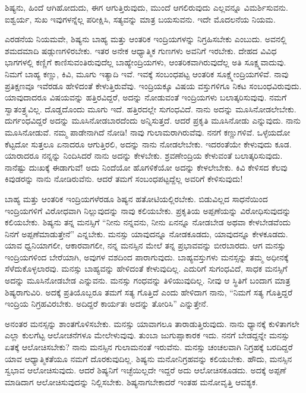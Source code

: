 ಶಿಷ್ಯನು, ಹಿಂದೆ ಆಗಿಹೋದುದು, ಈಗ ಆಗುತ್ತಿರುವುದು, ಮುಂದೆ ಆಗಲಿರುವುದು ಎಲ್ಲವನ್ನೂ ವಿಮರ್ಶಿಸುವನು. ಐಶ್ವರ್ಯ, ಸುಖ ಇವುಗಳನ್ನೆಲ್ಲ ಪರೀಕ್ಷಿಸಿ, ಸತ್ಯವನ್ನು ಮಾತ್ರ ಬಯಸುವನು. ಇದೇ ಮೊದಲನೆಯ ನಿಯಮ.

ಎರಡನೆಯ ನಿಯಮವೇ, ಶಿಷ್ಯನು ಬಾಹ್ಯ ಮತ್ತು ಆಂತರಿಕ ಇಂದ್ರಿಯಗಳನ್ನು ನಿಗ್ರಹಿಸಬೇಕು ಎಂಬುದು. ಅವನಲ್ಲಿ ಶಮದಮಾದಿ ಷಡ್ಗುಣಗಳಿರಬೇಕು. ಇತರ ಅನೇಕ ಆಧ್ಯಾತ್ಮಿಕ ಗುಣಗಳು ಅವನಿಗೆ ಇರಬೇಕು. ದೇಹದ ವಿವಿಧ ಭಾಗಗಳಲ್ಲಿ ಕಣ್ಣಿಗೆ ಕಾಣಿಸುವಂತಿರುವುದೆಲ್ಲ ಬಾಹ್ಯೇಂದ್ರಿಯಗಳು, ಆಂತರಿಕವಾಗಿರುವುದೆಲ್ಲ ಅತಿ ಸೂಕ್ಷ್ಮವಾದುವು. ನಿಮಗೆ ಬಾಹ್ಯ ಕಣ್ಣು, ಕಿವಿ, ಮೂಗು ಇತ್ಯಾದಿ ಇವೆ. ಇವಕ್ಕೆ ಸಂಬಂಧಪಟ್ಟ ಆಂತರಿಕ ಸೂಕ್ಷ್ಮೇಂದ್ರಿಯಗಳಿವೆ. ನಾವು ಪ್ರತಿಕ್ಷಣವೂ ಇವೆರಡೂ ಹೇಳಿದಂತೆ ಕೇಳುತ್ತಿರುವೆವು. ಇಂದ್ರಿಯಕ್ಕೂ ವಿಷಯ ವಸ್ತುಗಳಿಗೂ ನಿಕಟ ಸಂಬಂಧವಿರುವುದು. ಯಾವುದಾದರೂ ವಿಷಯವನ್ನು ಹತ್ತಿರವಿದ್ದರೆ, ಅದನ್ನು ನೋಡುವಂತೆ ಇಂದ್ರಿಯಗಳು ಬಲಾತ್ಕರಿಸುವುವು. ನಮಗೆ ಸ್ವಾತಂತ್ರ್ಯವಿಲ್ಲ. ದೊಡ್ಡದೊಂದು ಮೂಗು ಇದೆ. ಹತ್ತಿರದಲ್ಲೇ ಸುಗಂಧವಿದೆ. ನಾನು ಅದನ್ನು ಮೂಸಿನೋಡಲೇಬೇಕು. ದುರ್ಗಂಧವಿದ್ದರೆ ಅದನ್ನು ಮೂಸಿನೋಡಬಾರದೆಂದು ಅನ್ನಿಸುತ್ತದೆ. ಆದರೆ ಪ್ರಕೃತಿ ಮೂಸಿನೋಡು ಎನ್ನುವುದು. ನಾನು ಮೂಸಿನೋಡುವೆ. ನಮ್ಮ ಪಾಡೇನಾಗಿದೆ ನೋಡಿ! ನಾವು ಗುಲಾಮರಾಗಿರುವೆವು. ನನಗೆ ಕಣ್ಣುಗಳಿವೆ. ಒಳ್ಳೆಯದೋ ಕೆಟ್ಟದೋ ಸುತ್ತಲೂ ಏನಾದರೂ ಆಗುತ್ತಿರಲಿ, ಅದನ್ನು ನಾನು ನೋಡಲೇಬೇಕು. ಇದರಂತೆಯೇ ಕೇಳುವುದು ಕೂಡ. ಯಾರಾದರೂ ನನ್ನನ್ನು ನಿಂದಿಸಿದರೆ ನಾನು ಅದನ್ನು ಕೇಳಬೇಕು. ಶ್ರವಣೇಂದ್ರಿಯ ಕೇಳುವಂತೆ ಬಲಾತ್ಕರಿಸುವುದು. ನಾನೆಷ್ಟು ದುಃಖಕ್ಕೆ ಈಡಾಗುವೆ! ಅದು ನಿಂದೆಯೋ ಹೊಗಳಿಕೆಯೋ ಅದನ್ನು ಕೇಳಲೇಬೇಕು. ಕಿವಿ ಕೇಳಿಸದ ಕೆಲವು ಕಿವುಡರನ್ನು ನಾನು ನೋಡಿರುವೆನು. ಆದರೆ ತಮಗೆ ಸಂಬಂಧಪಟ್ಟದ್ದೆಲ್ಲ ಅವರಿಗೆ ಕೇಳಿಸುವುದು!

ಬಾಹ್ಯ ಮತ್ತು ಆಂತರಿಕ ಇಂದ್ರಿಯಗಳೆರಡೂ ಶಿಷ್ಯನ ಹತೋಟಿಯಲ್ಲಿರಬೇಕು. ಬಿಡುವಿಲ್ಲದ ಸಾಧನೆಯಿಂದ ಇಂದ್ರಿಯಗಳಿಗೆ ವಿರೋಧವಾಗಿ ನಿಲ್ಲುವುದನ್ನು ನಾವು ಕಲಿಯಬೇಕು. ಪ್ರಕೃತಿಯ ಅಪ್ಪಣೆಯನ್ನು ವಿರೋಧಿಸುವುದನ್ನು ಕಲಿಯಬೇಕು. ಶಿಷ್ಯನು ತನ್ನ ಮನಸ್ಸಿಗೆ “ನೀನು ನನ್ನವನು, ನೀನು ಏನನ್ನೂ ನೋಡಬೇಡ ಅಥವಾ ಕೇಳಬೇಡವೆಂದು ನಿನಗೆ ಅಪ್ಪಣೆಮಾಡುತ್ತೇನೆ'' ಎನ್ನಬೇಕು. ಮನಸ್ಸು ಯಾವುದನ್ನೂ ನೋಡಕೂಡದು, ಯಾವುದನ್ನೂ ಕೇಳಕೂಡದು. ಯಾವ ಧ್ವನಿಯಾಗಲೀ, ಆಕಾರವಾಗಲೀ, ನನ್ನ ಮನಸ್ಸಿನ ಮೇಲೆ ತನ್ನ ಪ್ರಭಾವವನ್ನು ಬೀರಬಾರದು. ಆಗ ಮನಸ್ಸು ಇಂದ್ರಿಯಗಳಿಂದ ಬೇರೆಯಾಗಿ, ಅವುಗಳ ವಶದಿಂದ ಪಾರಾಗುವುದು. ಬಾಹ್ಯವಸ್ತುಗಳು ಮನಸ್ಸನ್ನು ತಮ್ಮ ಅಧೀನಕ್ಕೆ ಸೆಳೆದುಕೊಳ್ಳಲಾರವು. ಮನಸ್ಸು ಬಾಹ್ಯವನ್ನು ಹೇಳಿದಂತೆ ಕೇಳುವುದಿಲ್ಲ. ಎದುರಿಗೆ ಸುಗಂಧವಿದೆ, ಸಾಧಕ ಮನಸ್ಸಿಗೆ ಅದನ್ನು ಮೂಸಿನೋಡಬೇಡ ಎನ್ನುವನು. ಮನಸ್ಸು ಗಂಧವನ್ನು ತಿಳಿಯುವುದಿಲ್ಲ. ನೀವು ಆ ಸ್ಥಿತಿಗೆ ಬಂದಾಗ ಮಾತ್ರ ಶಿಷ್ಯರಾಗುವಿರಿ. ಅದಕ್ಕೆ ಪ್ರತಿಯೊಬ್ಬರೂ ತಮಗೆ ಸತ್ಯ ಗೊತ್ತಿದೆ ಎಂದು ಹೇಳಿದಾಗ ನಾನು, “ನಿಮಗೆ ಸತ್ಯ ಗೊತ್ತಿದ್ದರೆ ಇಂದ್ರಿಯ ನಿಗ್ರಹವಿರಬೇಕು. ಅದಿದ್ದರೆ ಕಾರ್ಯತಃ ಅದನ್ನು ತೋರಿಸಿ” ಎನ್ನುತ್ತೇನೆ.

ಅನಂತರ ಮನಸ್ಸನ್ನು ಶಾಂತಗೊಳಿಸಬೇಕು. ಮನಸ್ಸು ಯಾವಾಗಲೂ ತಾರಾಡುತ್ತಿರುವುದು. ನಾನು ಧ್ಯಾನಕ್ಕೆ ಕುಳಿತಾಗಲೇ ಎಲ್ಲಾ ಕುಲಗೆಟ್ಟ ಆಲೋಚನೆಗಳೂ ಮೇಲೇಳುವುವು. ತುಂಬಾ ಜುಗುಪ್ಸಾಕಾರಕ ಇದು. ನನಗೆ ಬೇಡದ್ದನ್ನೇ ಮನಸ್ಸು ಏತಕ್ಕೆ ಆಲೋಚಿಸಬೇಕು? ನಾನು ಮನಸ್ಸಿನ ಗುಲಾಮನಂತೆ ಇರುವೆನು. ಮನಸ್ಸು ಚಂಚಲವಾಗಿ ನಿಗ್ರಹಕ್ಕೆ ಬರದಿದ್ದರೆ ಯಾವ ಆಧ್ಯಾತ್ಮಿಕತೆಯೂ ನಮಗೆ ದೊರಕುವುದಿಲ್ಲ. ಶಿಷ್ಯನು ಮನೋನಿಗ್ರಹವನ್ನು ಕಲಿಯಬೇಕು. ಹೌದು, ಮನಸ್ಸಿನ ಸ್ವಭಾವ ಆಲೋಚಿಸುವುದು. ಆದರೆ ಶಿಷ್ಯನಿಗೆ ಇಚ್ಛೆಯಿಲ್ಲದೇ ಇದ್ದರೆ ಅದು ಆಲೋಚಿಸಕೂಡದು. ಅದಕ್ಕೆ ಅಪ್ಪಣೆ ಮಾಡಿದಾಗ ಆಲೋಚಿಸುವುದನ್ನು ನಿಲ್ಲಿಸಬೇಕು. ಶಿಷ್ಯನಾಗಬೇಕಾದರೆ ಇಂತಹ ಮನೋವೃತ್ತಿ ಆವಶ್ಯಕ.

